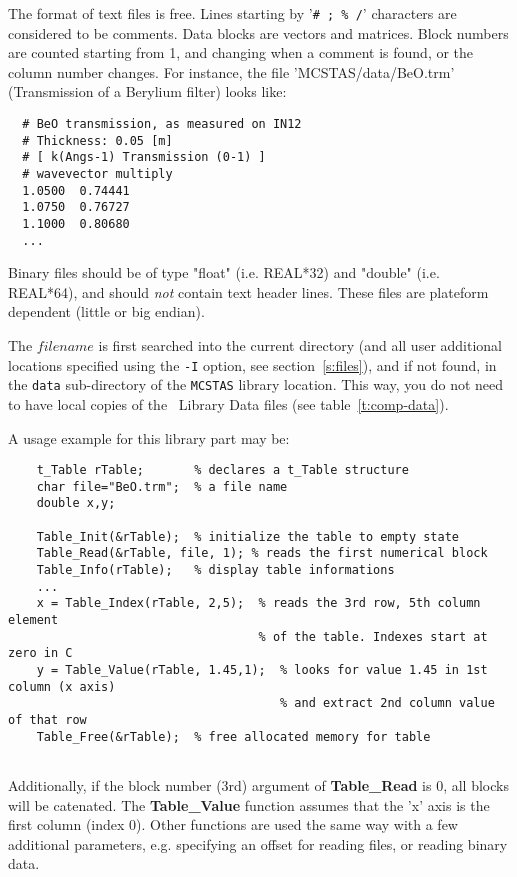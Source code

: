 The format of text files is free. Lines starting by '\verb+# ; % /+' characters are considered to be comments. Data blocks are vectors and matrices. Block numbers are counted starting from 1, and changing when a comment is found, or the column number changes. For instance, the file 'MCSTAS/data/BeO.trm' (Transmission of a Berylium filter) looks like:
\begin{verbatim}
  # BeO transmission, as measured on IN12
  # Thickness: 0.05 [m]
  # [ k(Angs-1) Transmission (0-1) ]
  # wavevector multiply
  1.0500  0.74441
  1.0750  0.76727
  1.1000  0.80680
  ...
\end{verbatim}
Binary files should be of type "float" (i.e. REAL*32) and "double" (i.e. REAL*64), and should \emph{not} contain text header lines. These files are plateform dependent (little or big endian).

The $filename$ is first searched into the current directory (and all user additional locations specified using the \verb+-I+ option, see section~\ref{s:files}), and if not found, in the \verb+data+ sub-directory of the \verb+MCSTAS+ library location. 
 This way, you do not need to have local copies of the \MCS\ Library Data files (see table~\ref{t:comp-data}).

A usage example for this library part may be:
\begin{verbatim}
    t_Table rTable;       % declares a t_Table structure
    char file="BeO.trm";  % a file name
    double x,y;
    
    Table_Init(&rTable);  % initialize the table to empty state
    Table_Read(&rTable, file, 1); % reads the first numerical block
    Table_Info(rTable);   % display table informations
    ...
    x = Table_Index(rTable, 2,5);  % reads the 3rd row, 5th column element 
                                   % of the table. Indexes start at zero in C
    y = Table_Value(rTable, 1.45,1);  % looks for value 1.45 in 1st column (x axis)
                                      % and extract 2nd column value of that row
    Table_Free(&rTable);  % free allocated memory for table
    
\end{verbatim}
Additionally, if the block number (3rd) argument of  {\bf Table\_Read} is 0, all blocks will be catenated.
The {\bf Table\_Value} function assumes that the 'x' axis is the first column (index 0).
Other functions are used the same way with a few additional parameters, e.g. specifying an offset for reading files, or reading binary data.

